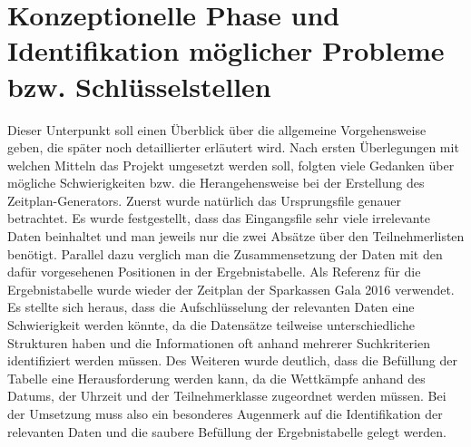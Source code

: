 \section{Konzeptionelle Phase und Identifikation möglicher Probleme bzw. Schlüsselstellen
}
Dieser Unterpunkt soll einen Überblick über die allgemeine Vorgehensweise geben, die später noch detaillierter erläutert wird. Nach ersten Überlegungen mit welchen Mitteln das Projekt umgesetzt werden soll, folgten viele Gedanken über mögliche Schwierigkeiten bzw. die Herangehensweise bei der Erstellung des Zeitplan-Generators. Zuerst wurde natürlich das Ursprungsfile genauer betrachtet. Es wurde festgestellt, dass das Eingangsfile sehr viele irrelevante Daten beinhaltet und man jeweils nur die zwei Absätze über den Teilnehmerlisten benötigt. Parallel dazu verglich man die Zusammensetzung der Daten mit den dafür vorgesehenen Positionen in der Ergebnistabelle. Als Referenz für die Ergebnistabelle wurde wieder der Zeitplan der Sparkassen Gala 2016 verwendet. Es stellte sich heraus, dass die Aufschlüsselung der relevanten Daten eine Schwierigkeit werden könnte, da die Datensätze teilweise unterschiedliche Strukturen haben und die Informationen oft anhand mehrerer Suchkriterien identifiziert werden müssen. Des Weiteren wurde deutlich, dass die Befüllung der Tabelle eine Herausforderung werden kann, da die Wettkämpfe anhand des Datums, der Uhrzeit und der Teilnehmerklasse zugeordnet werden müssen. Bei der Umsetzung muss also ein besonderes Augenmerk auf die Identifikation der relevanten Daten und die saubere Befüllung der Ergebnistabelle gelegt werden. 

